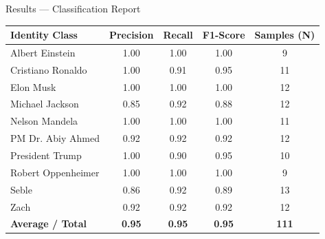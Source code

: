 \documentclass[aspectratio=169]{beamer}
\begin{document}
\begin{frame}{Results --- Classification Report}
  \centering
  \small
  \begin{tabular}{lcccc}
    \toprule
    \textbf{Identity Class} & \textbf{Precision} & \textbf{Recall} & \textbf{F1-Score} & \textbf{Samples (N)}\\
    \midrule
    Albert Einstein & 1.00 & 1.00 & 1.00 & 9\\
    Cristiano Ronaldo & 1.00 & 0.91 & 0.95 & 11\\
    Elon Musk & 1.00 & 1.00 & 1.00 & 12\\
    Michael Jackson & 0.85 & 0.92 & 0.88 & 12\\
    Nelson Mandela & 1.00 & 1.00 & 1.00 & 11\\
    PM Dr. Abiy Ahmed & 0.92 & 0.92 & 0.92 & 12\\
    President Trump & 1.00 & 0.90 & 0.95 & 10\\
    Robert Oppenheimer & 1.00 & 1.00 & 1.00 & 9\\
    Seble & 0.86 & 0.92 & 0.89 & 13\\
    Zach & 0.92 & 0.92 & 0.92 & 12\\
    \midrule
    \textbf{Average / Total} & \textbf{0.95} & \textbf{0.95} & \textbf{0.95} & \textbf{111}\\
    \bottomrule
  \end{tabular}
\end{frame}
\end{document}
